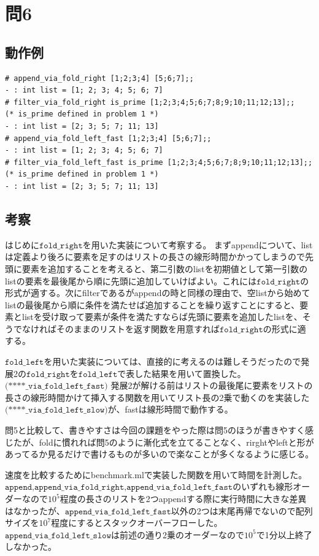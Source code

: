 \documentclass[11pt,a4paper]{jsarticle}
\begin{document}
\section*{問6}
\subsection*{動作例}
\begin{lstlisting}[basicstyle=\ttfamily\footnotesize, frame=single]
# append_via_fold_right [1;2;3;4] [5;6;7];;
- : int list = [1; 2; 3; 4; 5; 6; 7]
# filter_via_fold_right is_prime [1;2;3;4;5;6;7;8;9;10;11;12;13];;
(* is_prime defined in problem 1 *)
- : int list = [2; 3; 5; 7; 11; 13]
# append_via_fold_left_fast [1;2;3;4] [5;6;7];;
- : int list = [1; 2; 3; 4; 5; 6; 7]
# filter_via_fold_left_fast is_prime [1;2;3;4;5;6;7;8;9;10;11;12;13];;
(* is_prime defined in problem 1 *)
- : int list = [2; 3; 5; 7; 11; 13]
 \end{lstlisting}
\subsection*{考察}
はじめに$\texttt{fold\_right}$を用いた実装について考察する。
まずappendについて、listは定義より後ろに要素を足すのはリストの長さの線形時間かかってしまうので先頭に要素を追加することを考えると、第二引数のlistを初期値として第一引数のlistの要素を最後尾から順に先頭に追加していけばよい。これには$\texttt{fold\_right}$の形式が適する。次にfilterであるがappendの時と同様の理由で、空listから始めてlistの最後尾から順に条件を満たせば追加することを繰り返すことにすると、要素とlistを受け取って要素が条件を満たすならば先頭に要素を追加したlistを、そうでなければそのままのリストを返す関数を用意すれば$\texttt{fold\_right}$の形式に適する。
\par
$\texttt{fold\_left}$を用いた実装については、直接的に考えるのは難しそうだったので発展2の$\texttt{fold\_right}$を$\texttt{fold\_left}$で表した結果を用いて置換した。$\texttt{(****\_via\_fold\_left\_fast})$
発展2が解ける前はリストの最後尾に要素をリストの長さの線形時間かけて挿入する関数を用いてリスト長の2乗で動くのを実装した$\texttt{(****\_via\_fold\_left\_slow)}$が、fastは線形時間で動作する。
\par
問5と比較して、書きやすさは今回の課題をやった際は問5のほうが書きやすく感じたが、foldに慣れれば問5のように漸化式を立てることなく、rirghtやleftと形があってるか見るだけで書けるものが多いので楽なことが多くなるように感じる。
\par
速度を比較するためにbenchmark.mlで実装した関数を用いて時間を計測した。$\texttt{append,append\_via\_fold\_right,append\_via\_fold\_left\_fast}$のいずれも線形オーダーなので$10^5$程度の長さのリストを2つappendする際に実行時間に大きな差異はなかったが、$\texttt{append\_via\_fold\_left\_fast}$以外の2つは末尾再帰でないので配列サイズを$10^7$程度にするとスタックオーバーフローした。$\texttt{append\_via\_fold\_left\_slow}$は前述の通り2乗のオーダーなので$10^5$で1分以上終了しなかった。
\end{document}
